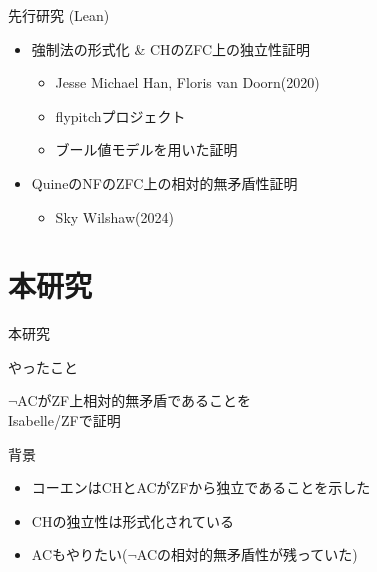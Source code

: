 \documentclass[17pt,aspectratio=169]{beamer}
\begin{document}
\begin{frame}{先行研究 (Lean)}
    \vspace{10pt}

    \begin{itemize}
        \item 強制法の形式化 \& CHのZFC上の独立性証明
              {\small \begin{itemize}
                  \item Jesse Michael Han, Floris van Doorn(2020)
                  \item flypitchプロジェクト
                  \item ブール値モデルを用いた証明
              \end{itemize} }

        \item QuineのNFのZFC上の相対的無矛盾性証明
              {\small \begin{itemize}
                  \item Sky Wilshaw(2024)
              \end{itemize} }

    \end{itemize}
\end{frame}

\section{本研究}

\begin{frame}{本研究}
    \begin{itembox}[l]{やったこと}
        \begin{center}
            $\neg$ACがZF上相対的無矛盾であることを\\Isabelle/ZFで証明
        \end{center}
    \end{itembox}

    背景
    \vspace{-10pt}
    {\small
        \begin{itemize}
            \setlength{\itemsep}{1pt}
            \item コーエンはCHとACがZFから独立であることを示した
            \item CHの独立性は形式化されている
            \item ACもやりたい{\footnotesize ($\neg$ACの相対的無矛盾性が残っていた)}
        \end{itemize}

    }
\end{frame}
\end{document}
